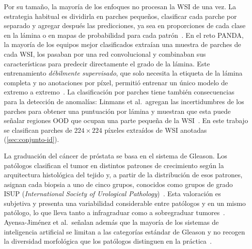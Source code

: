 Por su tamaño, la mayoría de los enfoques no procesan la WSI de una vez. La
estrategia habitual es dividirla en parches pequeños, clasificar cada parche por
separado y agregar después las predicciones, ya sea en proporciones de cada clase
en la lámina o en mapas de probabilidad para cada patrón~\cite{ayensa2026}. En el
reto PANDA, la mayoría de los equipos mejor clasificados extraían una muestra de
parches de cada WSI, los pasaban por una red convolucional y combinaban sus
características para predecir directamente el grado de la lámina. Este
entrenamiento \emph{débilmente supervisado}, que solo necesita la etiqueta de la
lámina completa y no anotaciones por píxel, permitió entrenar un único modelo de
extremo a extremo~\cite{bulten2022}. La clasificación por parches tiene también
consecuencias para la detección de anomalías: Linmans et al.\ agregan las
incertidumbres de los parches para obtener una puntuación por lámina y muestran
que esta puede señalar regiones OOD que ocupan una parte pequeña de la
WSI~\cite{linmans2023}. En este trabajo se clasifican parches de
$224 \times 224$ píxeles extraídos de WSI anotadas (\cref{sec:conjunto-id}).

La graduación del cáncer de próstata se basa en el sistema de Gleason. Los
patólogos clasifican el tumor en distintos patrones de crecimiento según la
arquitectura histológica del tejido y, a partir de la distribución de esos
patrones, asignan cada biopsia a uno de cinco grupos, conocidos como grupos de
grado ISUP (\emph{International Society of Urological Pathology})~\cite{bulten2022}.
Esta valoración es subjetiva y presenta una variabilidad considerable entre
patólogos y en un mismo patólogo, lo que lleva tanto a infragraduar como a
sobregraduar tumores~\cite{bulten2022}. Ayensa-Jiménez et al.\ señalan además
que la mayoría de los sistemas de inteligencia artificial se limitan a las
categorías estándar de Gleason y no recogen la diversidad morfológica que los
patólogos distinguen en la práctica~\cite{ayensa2026}.


